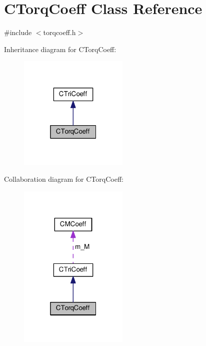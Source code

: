 \hypertarget{classCTorqCoeff}{\section{C\-Torq\-Coeff Class Reference}
\label{classCTorqCoeff}
}


{\ttfamily \#include $<$torqcoeff.\-h$>$}



Inheritance diagram for C\-Torq\-Coeff\-:
\nopagebreak
\begin{figure}[H]
\begin{center}
\leavevmode
\includegraphics[width=148pt]{classCTorqCoeff__inherit__graph}
\end{center}
\end{figure}


Collaboration diagram for C\-Torq\-Coeff\-:
\nopagebreak
\begin{figure}[H]
\begin{center}
\leavevmode
\includegraphics[width=148pt]{classCTorqCoeff__coll__graph}
\end{center}
\end{figure}
